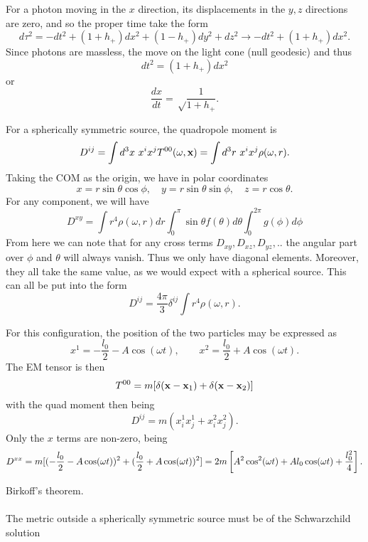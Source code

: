 \documentclass[10pt,letterpaper]{article}
\begin{document}
\item
For a photon moving in the $x$ direction, its displacements in the $y,z$ directions are zero, and so the proper time take the form
\[
	d\tau^2 = -dt^2 +(1+h_+)dx^2 + (1-h_+)dy^2 + dz^2 \to -dt^2 + (1+h_+)dx^2.
\]
Since photons are massless, the move on the light cone (null geodesic) and thus
\[
	dt^2 = (1+h_+)dx^2
\]
or
\[
	\frac{dx}{dt} = \sqrt\frac{1}{1+h_+}.
\]

\item
\benum
\item
For a spherically symmetric source, the quadropole moment is
\[
	D^{ij}  = \int d^3x\ x^ix^j T^{00}(\omega,\mathbf{x}) = \int d^3r\ x^ix^j \rho(\omega, r).
\]
Taking the COM as the origin, we have in polar coordinates
\[
	x = r\sin\theta\cos\phi,\quad y = r\sin\theta\sin\phi,\quad z = r\cos\theta.
\]
For any component, we will have 
\[
	D^{xy} = \int r^4 \rho(\omega,r)dr\int_0^\pi \sin\theta f(\theta)d\theta \int_0^{2\pi} g(\phi) d\phi
\]
From here we can note that for any cross terms $D_{xy}, D_{xz}, D_{yz}, ..$ the angular part over $\phi$ and $\theta$ will always vanish. Thus we only have diagonal elements. Moreover, they all take the same value, as we would expect with a spherical source. This can all be put into the form
\[
	D^{ij} = \frac{4\pi}{3}\delta^{ij}\int r^4 \rho(\omega, r).
\]
\item
For this configuration, the position of the two particles may be expressed as
\[
	x^1 = -\frac{l_0}{2} - A\cos(\omega t),\qquad x^2 = \frac{l_0}{2}+A\cos(\omega t).
\]
The EM tensor is then
\[
	T^{00} = m[\delta(\mathbf{x}-\mathbf{x}_1)+\delta(\mathbf{x}-\mathbf{x}_2)]
\]
with the quad moment then being
\[
	D^{ij} = m(x^1_i x^1_j + x^2_i x^2_j).
\]
Only the $x$ terms are non-zero, being
\[
	D^{xx} = m[ (-\frac{l_0}{2} - A\cos(\omega t))^2 + ( \frac{l_0}{2} + A\cos(\omega t))^2] = 2m\left[A^2\cos^2(\omega t) + Al_0\cos(\omega t)
	+\frac{l_0^2}{4}\right].
\]
\eenum
\item
Birkoff's theorem.
\\ \\
The metric outside a spherically symmetric source must be of the Schwarzchild solution
\end{document}
